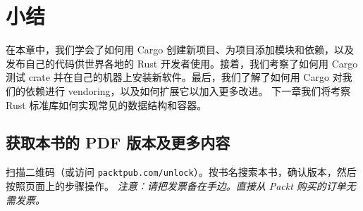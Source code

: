 \section{小结}
在本章中，我们学会了如何用 Cargo 创建新项目、为项目添加模块和依赖，以及发布自己的代码供世界各地的 Rust 开发者使用。接着，我们考察了如何用 Cargo 测试 crate 并在自己的机器上安装新软件。最后，我们了解了如何用 Cargo 对我们的依赖进行 vendoring，以及如何扩展它以加入更多改进。
下一章我们将考察 Rust 标准库如何实现常见的数据结构和容器。
\begin{samepage}
\subsection{获取本书的 PDF 版本及更多内容}
扫描二维码（或访问 \texttt{packtpub.\allowbreak{}com/\allowbreak{}unlock}）。按书名搜索本书，确认版本，然后按照页面上的步骤操作。
\emph{注意：请把发票备在手边。直接从 Packt 购买的订单无需发票。}
\end{samepage}
